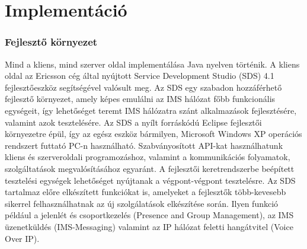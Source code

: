 \section{Implementáció}

\subsubsection{Fejlesztő környezet}

Mind a kliens, mind szerver oldal implementálása Java nyelven történik. A kliens oldal az Ericsson cég által nyújtott Service Development Studio (SDS) 4.1 fej\-lesz\-tő\-esz\-köz segítségével valósult meg. Az SDS egy szabadon hozzáférhető fejlesztő környezet, amely képes emulálni az IMS hálózat főbb funkcionális egységeit, így lehetőséget teremt IMS hálózatra szánt alkalmazások fejlesztésére, valamint azok tesztelésére. Az SDS a nyílt forráskódú Eclipse fejlesztői környezetre épül, így az egész eszköz bármilyen, Microsoft Windows XP operációs rendszert futtató PC-n használható. Szabványosított API-kat használhatunk kliens és szer\-ver\-ol\-da\-li programozáshoz, valamint a kommunikációs folyamatok, szolgáltatások megvalósításához egyaránt. A fejlesztői keretrendszerbe beépített tesztelési egységek lehetőséget nyújtanak a végpont-végpont tesztelésre. Az SDS tartalmaz előre elkészített funkciókat is, amelyeket a fejlesztők több-kevesebb sikerrel felhasználhatnak az új szolgálatások elkészítése során. Ilyen funkció például a jelenlét és csoportkezelés (Presence and Group Management), az IMS üzenetküldés (IMS-Messaging) valamint az IP hálózat feletti hangátvitel (Voice Over IP).